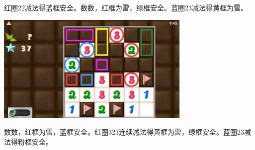 红圈22减法得蓝框安全。数数，红框为雷，绿框安全。蓝圈23减法得黄框为雷。
\begin{center}
    \includegraphics[width=0.7\textwidth]{puzzlelow/235-4.jpg}
\end{center}
数数，红框为雷，蓝框安全。红圈323连续减法得黄框为雷，绿框安全。蓝圈23减法得粉框安全。

